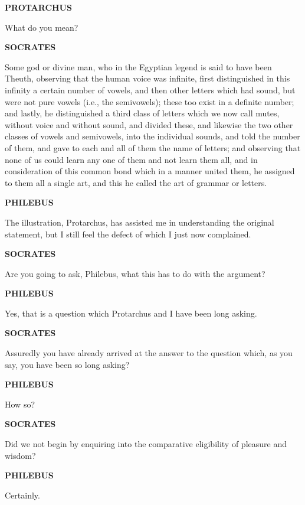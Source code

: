 \documentclass[11pt,letter]{article}
\begin{document}
\par \textbf{PROTARCHUS}
\par   What do you mean?

\par \textbf{SOCRATES}
\par   Some god or divine man, who in the Egyptian legend is said to have been Theuth, observing that the human voice was infinite, first distinguished in this infinity a certain number of vowels, and then other letters which had sound, but were not pure vowels (i.e., the semivowels); these too exist in a definite number; and lastly, he distinguished a third class of letters which we now call mutes, without voice and without sound, and divided these, and likewise the two other classes of vowels and semivowels, into the individual sounds, and told the number of them, and gave to each and all of them the name of letters; and observing that none of us could learn any one of them and not learn them all, and in consideration of this common bond which in a manner united them, he assigned to them all a single art, and this he called the art of grammar or letters.

\par \textbf{PHILEBUS}
\par   The illustration, Protarchus, has assisted me in understanding the original statement, but I still feel the defect of which I just now complained.

\par \textbf{SOCRATES}
\par   Are you going to ask, Philebus, what this has to do with the argument?

\par \textbf{PHILEBUS}
\par   Yes, that is a question which Protarchus and I have been long asking.

\par \textbf{SOCRATES}
\par   Assuredly you have already arrived at the answer to the question which, as you say, you have been so long asking?

\par \textbf{PHILEBUS}
\par   How so?

\par \textbf{SOCRATES}
\par   Did we not begin by enquiring into the comparative eligibility of pleasure and wisdom?

\par \textbf{PHILEBUS}
\par   Certainly.
\end{document}
